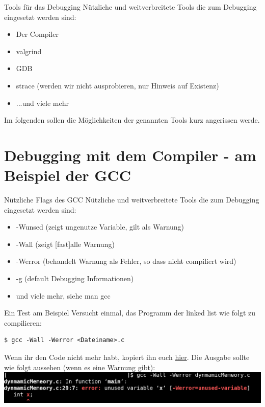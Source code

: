 
\begin{frame}{Tools für das Debugging}
	Nützliche und weitverbreitete Tools die zum Debugging eingesetzt werden sind:
	\begin{itemize}
		\item Der Compiler
		\item valgrind
		\item GDB
		\item strace (werden wir nicht ausprobieren, nur Hinweis auf Existenz)
		\item ...und viele mehr
	\end{itemize}
	Im folgenden sollen die Möglichkeiten der genannten Tools kurz angerissen werde.
\end{frame}

\section{Debugging mit dem Compiler - am Beispiel der GCC}


\begin{frame}{N\"utzliche Flags des GCC}
	Nützliche und weitverbreitete Tools die zum Debugging eingesetzt werden sind:
	\begin{itemize}
		\item -Wunsed (zeigt ungenutze Variable, gilt als Warnung)
		\item -Wall (zeigt [fast]alle Warnung)
		\item -Werror (behandelt Warnung als Fehler, so dass nicht compiliert wird)
		\item -g (default Debugging Informationen) 
		\item und viele mehr, siehe man gcc
	\end{itemize}
\end{frame}

\begin{frame}[fragile]{Ein Test am Beispiel}
	Versucht einmal, das Programm der linked list wie folgt zu compilieren:
		\begin{lstlisting}[numbers=none]
$ gcc -Wall -Werror <Dateiname>.c\end{lstlisting}
Wenn ihr den Code nicht mehr habt, kopiert ihn euch \href{https://github.com/scholzp/c-lessons/blob/master/materials/memory_allocation/dynmamicMemeory.c}{hier}.
Die Ausgabe sollte wie folgt aussehen (wenn es eine Warnung gibt):
\\
\bigskip
\includegraphics[width = \linewidth]{../img/gccWerror.png}
\end{frame}

